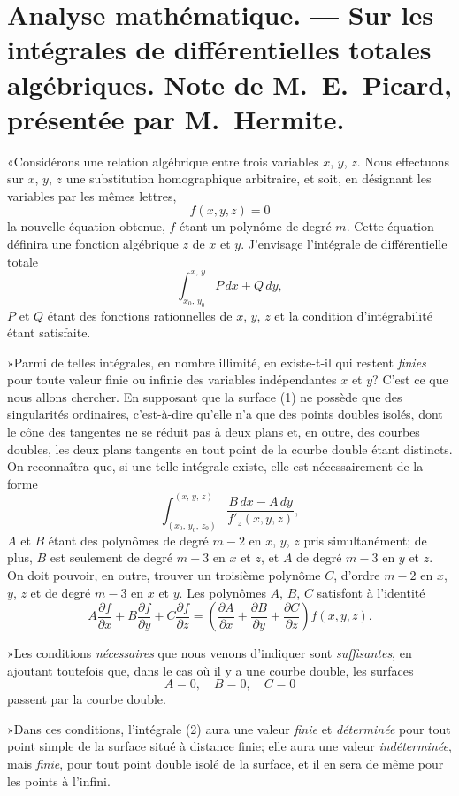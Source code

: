 \documentclass{article}
\begin{document}
\section*{Analyse mathématique. --- Sur les intégrales de différentielles totales algébriques. Note de M.~E.~Picard, présentée par M.~Hermite.}

«Considérons une relation algébrique entre trois variables $x$, $y$, $z$. Nous effectuons sur $x$, $y$, $z$ une substitution homographique arbitraire, et soit, en désignant les variables par les mêmes lettres,
\[
f(x, y, z) = 0
\tag{1}
\]
la nouvelle équation obtenue, $f$ étant un polynôme de degré $m$. Cette équation définira une fonction algébrique $z$ de $x$ et $y$. J'envisage l'intégrale de différentielle totale
\[
\int_{x_{0},\,y_{0}}^{x,\,y} P\,dx + Q\,dy,
\]
$P$ et $Q$ étant des fonctions rationnelles de $x$, $y$, $z$ et la condition d'intégrabilité étant satisfaite.

»Parmi de telles intégrales, en nombre illimité, en existe-t-il qui restent \emph{finies} pour toute valeur finie ou infinie des variables indépendantes $x$ et $y$? C'est ce que nous allons chercher. En supposant que la surface (1) ne possède que des singularités ordinaires, c'est-à-dire qu'elle n'a que des points doubles isolés, dont le cône des tangentes ne se réduit pas à deux plans et, en outre, des courbes doubles, les deux plans tangents en tout point de la courbe double étant distincts. On reconnaîtra que, si une telle intégrale existe, elle est nécessairement de la forme
\[
\int_{(x_{0},\,y_{0},\,z_{0})}^{(x,\,y,\,z)} \frac{B\,dx - A\,dy}{f'_{z}(x, y, z)},
\tag{2}
\]
$A$ et $B$ étant des polynômes de degré $m - 2$ en $x$, $y$, $z$ pris simultanément; de plus, $B$ est seulement de degré $m - 3$ en $x$ et $z$, et $A$ de degré $m - 3$
en $y$ et $z$. On doit pouvoir, en outre, trouver un troisième polynôme $C$, d'ordre $m - 2$ en $x$, $y$, $z$ et de degré $m - 3$ en $x$ et $y$. Les polynômes $A$, $B$, $C$ satisfont à l'identité
\[
A \frac{\partial f}{\partial x} + B \frac{\partial f}{\partial y} + C \frac{\partial f}{\partial z} = \left(\frac{\partial A}{\partial x} + \frac{\partial B}{\partial y} + \frac{\partial C}{\partial z}\right) f(x, y, z).
\tag{3}
\]

»Les conditions \emph{nécessaires} que nous venons d'indiquer sont \emph{suffisantes}, en ajoutant toutefois que, dans le cas où il y a une courbe double, les surfaces
\[
A = 0, \quad B = 0, \quad C = 0
\]
passent par la courbe double.

»Dans ces conditions, l'intégrale (2) aura une valeur \emph{finie} et \emph{déterminée} pour tout point simple de la surface situé à distance finie; elle aura une valeur \emph{indéterminée}, mais \emph{finie}, pour tout point double isolé de la surface, et il en sera de même pour les points à l'infini.
\end{document}
